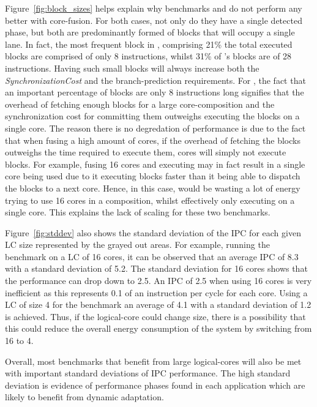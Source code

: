 Figure~\ref{fig:block_sizes} helps explain why benchmarks  and  do not perform any better with core-fusion.
For both cases, not only do they have a single detected phase, but both are predominantly formed of blocks that will occupy a single lane.
In fact, the most frequent block in , comprising 21\% the total executed blocks are comprised of only 8 instructions, whilst 31\% of 's blocks are of 28 instructions.
Having such small blocks will always increase both the \textit{SynchronizationCost} and the branch-prediction requirements.
For , the fact that an important percentage of blocks are only 8 instructions long signifies that the overhead of fetching enough blocks for a large core-composition and the synchronization cost for committing them outweighs executing the blocks on a single core.
The reason there is no degredation of performance is due to the fact that when fusing a high amount of cores, if the overhead of fetching the blocks outweighs the time required to execute them, cores will simply not execute blocks.
For example, fusing 16 cores and executing  may in fact result in a single core being used due to it executing blocks faster than it being able to dispatch the blocks to a next core.
Hence, in this case,  would be wasting a lot of energy trying to use 16 cores in a composition, whilst effectively only executing on a single core. 
This explains the lack of scaling for these two benchmarks.

Figure~\ref{fig:stddev} also shows the standard deviation of the IPC for each given LC size represented by the grayed out areas.
For example, running the  benchmark on a LC of 16 cores, it can be observed that an average IPC of 8.3 with a standard deviation of 5.2.
The standard deviation for 16 cores shows that the performance can drop down to 2.5.
An IPC of 2.5 when using 16 cores is very inefficient as this represents 0.1 of an instruction per cycle for each core.
Using a LC of size 4 for the  benchmark an average of 4.1 with a standard deviation of 1.2 is achieved.
Thus, if the logical-core could change size, there is a possibility that this could reduce the overall energy consumption of the system by switching from 16 to 4.

Overall, most benchmarks that benefit from large logical-cores will also be met with important standard deviations of IPC performance.
The high standard deviation is evidence of performance phases found in each application which are likely to benefit from dynamic adaptation.
